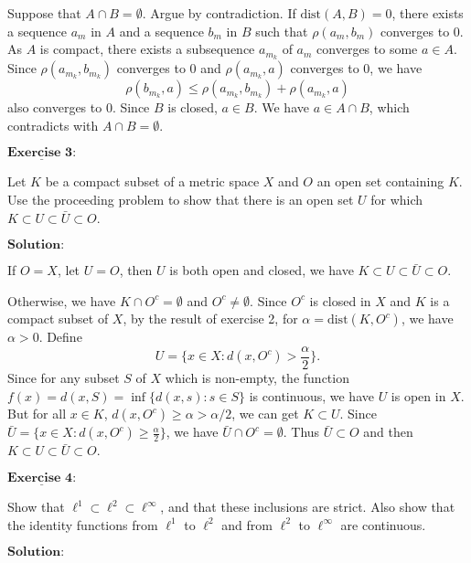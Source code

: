 \documentclass[12pt,a4paper]{ctexart}
\begin{document}
Suppose that $A \cap B = \emptyset$. Argue by contradiction. If $\text{dist} (A, B) = 0$, there exists a sequence $a_m$ in $A$ and a sequence $b_m$ in $B$ such that $\rho(a_m, b_m)$ converges to $0$. As $A$ is compact, there exists a subsequence $a_{m_{k}}$ of $a_m$ converges to some $a \in A$. Since $\rho(a_{m_k}, b_{m_k})$ converges to $0$ and $\rho(a_{m_k}, a)$ converges to $0$, we have
$$\rho(b_{m_k}, a) \leq \rho(a_{m_k}, b_{m_k}) + \rho(a_{m_k}, a)$$
also converges to $0$. Since $B$ is closed, $a \in B$. We have $a \in A \cap B$, which contradicts with $A \cap B = \emptyset$.


\newpage

$\underline{\textbf{Exercise 3:}}$

Let $K$ be a compact subset of a metric space $X$ and $O$ an open set containing $K$. Use the proceeding problem to show that there is an open set $U$ for which $K \subset U \subset \bar{U} \subset O$.
 
\vspace{8pt}
$\textbf{Solution:}$

If $O = X$, let $ U = O$, then $U$ is both open and closed, we have $K \subset U \subset \bar{U} \subset O$.

Otherwise, we have $K \cap O^c = \emptyset$ and $O^c \neq \emptyset$. Since $O^c$ is closed in $X$ and $K$ is a compact subset of $X$, by the result of exercise 2, for $\alpha = \text{dist} (K, O^c) $, we have $\alpha > 0$. Define
$$U = \{x \in X: d(x, O^c) > \frac{\alpha}{2} \}.$$
Since for any subset $S$ of $X$ which is non-empty, the function $f(x) = d(x, S) = \inf \{d(x, s): s \in S\}$ is continuous, we have $U$ is open in $X$. But for all $x \in K$, $d(x, O^c) \geq \alpha > \alpha /2$, we can get $K \subset U$. Since $\bar U = \{x \in X: d(x, O^c) \geq \frac{\alpha}{2} \}$, we have $\bar U \cap O^c = \emptyset$. Thus $\bar U \subset O$ and then $K \subset U \subset \bar{U} \subset O$.


\newpage

$\underline{\textbf{Exercise 4:}}$ 

Show that $\ell^1 \subset \ell^2 \subset \ell^{\infty}$, and that these inclusions are strict. Also show that the identity functions from $\ell^1$ to $\ell^2$ and from $\ell^2$ to $\ell^{\infty}$ are continuous.

\vspace{8pt}
$\textbf{Solution:}$
\end{document}
